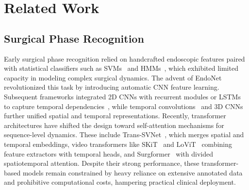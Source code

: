 \section{Related Work}
\label{sec:related_work}

\subsection{Surgical Phase Recognition}
Early surgical phase recognition relied on handcrafted endoscopic features paired with statistical classifiers such as SVMs~\cite{klank2008automatic} and HMMs~\cite{padoy2012statistical}, which exhibited limited capacity in modeling complex surgical dynamics. The advent of EndoNet~\cite{twinanda2016endonet} revolutionized this task by introducing automatic CNN feature learning. Subsequent frameworks integrated 2D CNNs with recurrent modules or LSTMs to capture temporal dependencies~\cite{yengera2018less,jin2021temporal,jin2017sv}, while temporal convolutions~\cite{czempiel2020tecno} and 3D CNNs~\cite{kitaguchi2021development,zhang2021surgical} further unified spatial and temporal representations. Recently, transformer architectures have shifted the design toward self-attention mechanisms for sequence-level dynamics. These include Trans-SVNet~\cite{gao2021trans}, which merges spatial and temporal embeddings, video transformers like SKiT~\cite{liu2023skit} and LoViT~\cite{liu2025lovit} combining feature extractors with temporal heads, and Surgformer~\cite{yang2024surgformer} with divided spatiotemporal attention. Despite their strong performance, these transformer-based models remain constrained by heavy reliance on extensive annotated data and prohibitive computational costs, hampering practical clinical deployment.


